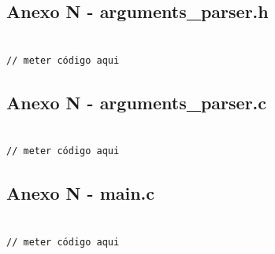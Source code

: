\documentclass[11pt]{article}
\begin{document}
\subsection{ Anexo N - arguments_parser.h}

\begin{lstlisting}[style=CStyle]

// meter código aqui

\end{lstlisting}

\subsection{ Anexo N - arguments_parser.c}

\begin{lstlisting}[style=CStyle]

// meter código aqui

\end{lstlisting}

\subsection{ Anexo N - main.c}

\begin{lstlisting}[style=CStyle]

// meter código aqui

\end{lstlisting}

\pagebreak
\end{document}
